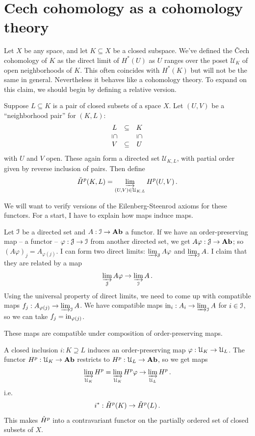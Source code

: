 \section{Cech cohomology as a cohomology theory}


Let $X$ be any space, and let $K\subseteq X$ be a closed subspace.
We've defined the \v{C}ech cohomology of $K$ as the direct limit of 
$H^*(U)$ as $U$ ranges over the poset $\mathcal{U}_K$ of open neighborhoods
of $K$. This often coincides with $H^*(K)$ but will not be the same in
general. Nevertheless it behaves like a cohomology theory. To expand on
this claim, we should begin by defining a relative version. 

Suppose $L\subseteq K$ is a pair of  closed subsets of a space $X$.  Let 
$(U,V)$ be a ``neighborhood pair'' for $(K,L)$: 
\[
\begin{array}{ccc} L & \subseteq & K \\
\downsubseteq & & \downsubseteq \\
V & \subseteq & U
\end{array}
\]
with $U$ and $V$ open. These again form a directed set $\mathcal{U}_{K,L}$,
with partial order given by reverse inclusion of pairs. Then define
\[
\check{H}^p(K,L)=\varinjlim_{(U,V)\in\mathcal{U}_{K,L}} H^p(U,V)\,.
\]

We will want to verify versions of the Eilenberg-Steenrod axioms for these
functors. For a start, I have to explain how maps induce maps. 

Let $\mathcal I$ be a directed set and $A:\mathcal I\to \mathbf{Ab}$  a functor. 
If we have an order-preserving map -- a functor -- $\varphi:\mathcal J\to\mathcal I$ 
from another directed set, we get 
$A\varphi:\mathcal J\to\mathbf{Ab}$; so $(A\varphi)_j=A_{\varphi(j)}$.
I can form two direct limits: $\varinjlim_{\mathcal J}A\varphi$ and $\varinjlim_{\mathcal I}A$. I claim that they are related by a map 
\[
\varinjlim_{\mathcal J}A\varphi\to\varinjlim_{\mathcal I}A\,.
\] 
Using the universal property of direct limits, we need to come up with compatible maps $f_j:A_{\varphi(j)}\to\varinjlim_{\mathcal I}A$. We have compatible maps 
$\mathrm{in}_i:A_i\to\varinjlim_{\mathcal I}A$ for $i\in\mathcal I$, so we can take 
$f_j=\mathrm{in}_{\varphi(j)}$. 

These maps are compatible under composition of order-preserving maps. 

\begin{example}
A closed inclusion $i:K\supseteq L$ induces an order-preserving map
$\varphi:\mathcal U_K\to\mathcal U_L$. The functor $H^p:\mathcal U_K\to\mathbf{Ab}$ restricts
to $H^p:\mathcal U_L\to\mathbf{Ab}$, so we get maps
\[
\varinjlim_{\mathcal U_K}H^p=\varinjlim_{\mathcal U_K}H^p\varphi\to\varinjlim_{\mathcal U_L}H^p\,.
\]
i.e.
\[
i^*:\check{H}^p(K)\to\check{H}^p(L)\,.
\]
This makes $\check{H}^p$ into a contravariant functor on the partially ordered 
set of closed subsets of $X$. 
\end{example}

